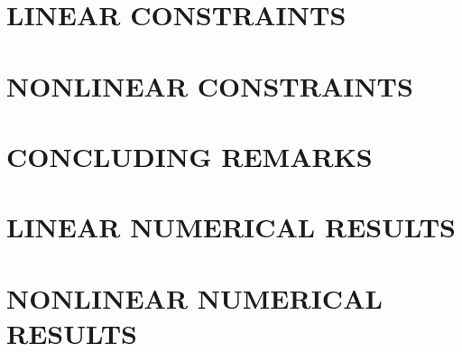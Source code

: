 \documentclass[11pt,letterpaper]{thesis2}
\begin{document}
\chapter{LINEAR CONSTRAINTS}\label{chap:linear}
 \begin{raggedright}

 \end{raggedright}
\chapter{NONLINEAR CONSTRAINTS}\label{chap:general}
 \begin{raggedright}

 \end{raggedright}
\chapter{CONCLUDING REMARKS}\label{chap:conclusion}
 \begin{raggedright}

 \end{raggedright}

\begin{appendix}

\chapter{LINEAR NUMERICAL RESULTS}


\chapter{NONLINEAR NUMERICAL RESULTS}


\end{appendix}




\end{document}

